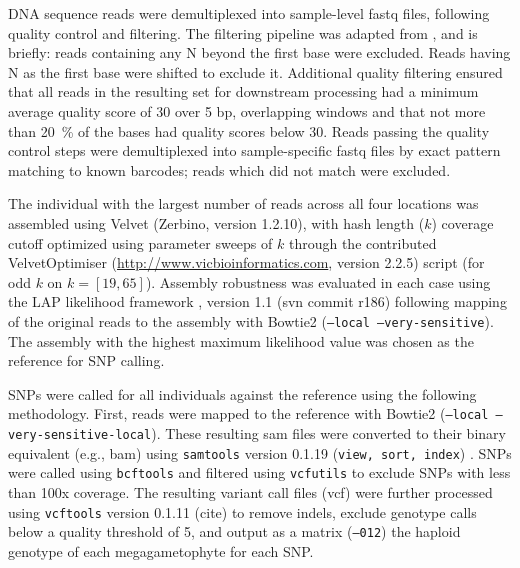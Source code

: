 \documentclass[11pt]{article}
\begin{document}
DNA sequence reads were demultiplexed into sample-level fastq files, following quality control 
and filtering.  The filtering pipeline was adapted from \citep{Friedline:2012fm}, and is briefly: reads 
containing any N beyond the first base were excluded. Reads having N as the first base were shifted 
to exclude it.  Additional quality filtering ensured that all reads in the resulting set for downstream 
processing had a minimum average quality score of 30 over 5 bp, overlapping windows 
and that not more than \SI{20}{\percent} of the bases had quality scores below 30. Reads passing the 
quality control steps were demultiplexed into sample-specific fastq files by exact pattern matching to 
known barcodes; reads which did not match were excluded.

The individual with the largest number of reads across all four locations was assembled using 
Velvet (Zerbino, version 1.2.10), with hash length ($k$) coverage cutoff optimized using parameter sweeps of $k$ 
through the contributed VelvetOptimiser (\url{http://www.vicbioinformatics.com}, version 2.2.5) 
script (for odd $k$ on $k=[19,65]$).  Assembly robustness was evaluated in each case using the LAP likelihood 
framework \citep{Ghodsi:2013bc}, version 1.1 (svn commit r186) following mapping of the original reads to the 
assembly with Bowtie2 \citep{Langmead:2012jh} (\texttt{--local --very-sensitive}).  The assembly with the highest 
maximum likelihood value was chosen as the reference for SNP calling.

SNPs were called for all individuals against the reference using the following methodology.  First, 
reads were mapped to the reference with Bowtie2 (\texttt{--local --very-sensitive-local}).  These resulting 
sam files were converted to their binary equivalent (e.g., bam) using \texttt{samtools} version 0.1.19 
(\texttt{view, sort, index}) \citep{Li:2009ka}.  SNPs were called using \texttt{bcftools} and filtered using 
\texttt{vcfutils} to exclude SNPs with less than 100x coverage. The resulting variant call files (vcf) 
were further processed using \texttt{vcftools} version 0.1.11 (cite) to remove indels, exclude genotype 
calls below a quality threshold of 5, and output as a matrix (\texttt{--012}) the haploid genotype of each megagametophyte for each SNP.  
\end{document}

